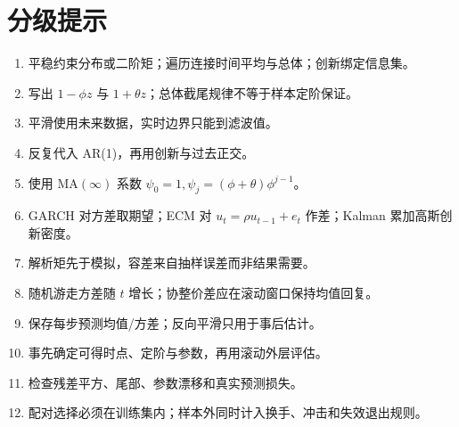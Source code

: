 \section*{分级提示}
\begingroup\small
\begin{enumerate}[nosep,leftmargin=*]
\item 平稳约束分布或二阶矩；遍历连接时间平均与总体；创新绑定信息集。
\item 写出 $1-\phi z$ 与 $1+\theta z$；总体截尾规律不等于样本定阶保证。
\item 平滑使用未来数据，实时边界只能到滤波值。
\item 反复代入 AR(1)，再用创新与过去正交。
\item 使用 MA$(\infty)$ 系数 $\psi_0=1,\psi_j=(\phi+\theta)\phi^{j-1}$。
\item GARCH 对方差取期望；ECM 对 $u_t=\rho u_{t-1}+e_t$ 作差；Kalman 累加高斯创新密度。
\item 解析矩先于模拟，容差来自抽样误差而非结果需要。
\item 随机游走方差随 $t$ 增长；协整价差应在滚动窗口保持均值回复。
\item 保存每步预测均值/方差；反向平滑只用于事后估计。
\item 事先确定可得时点、定阶与参数，再用滚动外层评估。
\item 检查残差平方、尾部、参数漂移和真实预测损失。
\item 配对选择必须在训练集内；样本外同时计入换手、冲击和失效退出规则。
\end{enumerate}
\endgroup
